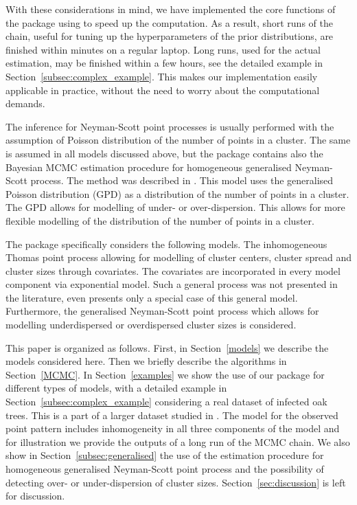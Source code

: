 With these considerations in mind, we have implemented the core functions of the  package using  to speed up the computation. As a result, short runs of the chain, useful for tuning up the hyperparameters of the prior distributions, are finished within minutes on a regular laptop. Long runs, used for the actual estimation, may be finished within a few hours, see the detailed example in Section~\ref{subsec:complex_example}. This makes our implementation easily applicable in practice, without the need to worry about the computational demands.

The inference for Neyman-Scott point processes is usually performed with the assumption of Poisson distribution of the number of points in a cluster. The same is assumed in all models discussed above, but the  package contains also the Bayesian MCMC estimation procedure for homogeneous generalised Neyman-Scott process. The method was described in \cite{AM2020}. This model uses the generalised Poisson distribution (GPD) as a distribution of the number of points in a cluster. The GPD allows for modelling of under- or over-dispersion. This allows for more flexible modelling of the distribution of the number of points in a cluster.

The package specifically considers the following models. The inhomogeneous Thomas point process allowing for modelling of cluster centers, cluster spread and cluster sizes through covariates. The covariates are incorporated in every model component via exponential model. Such a general process was not presented in the literature, even \cite{MS2017} presents only a special case of this general model. Furthermore, the generalised Neyman-Scott point process which allows for modelling underdispersed or overdispersed cluster sizes is considered.

This paper is organized as follows. First, in Section~\ref{models} we describe the models considered here. Then we briefly describe the algorithms in Section~\ref{MCMC}. In Section~\ref{examples} we show the use of our package for different types of models, with a detailed example in Section~\ref{subsec:complex_example} considering a real dataset of infected oak trees. This is a part of a larger dataset studied in \citet{FFCGA2019}. The model for the observed point pattern includes inhomogeneity in all three components of the model and for illustration we provide the outputs of a long run of the MCMC chain. We also show in Section~\ref{subsec:generalised} the use of the estimation procedure for homogeneous generalised Neyman-Scott point process and the possibility of detecting over- or under-dispersion of cluster sizes. Section~\ref{sec:discussion} is left for discussion.

